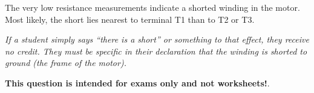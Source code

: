 
The very low resistance measurements indicate a shorted winding in the motor.  Most likely, the short lies nearest to terminal T1 than to T2 or T3. 

{\it If a student simply says ``there is a short'' or something to that effect, they receive no credit.  They must be specific in their declaration that the winding is shorted to ground (the frame of the motor).}







{\bf This question is intended for exams only and not worksheets!}.


